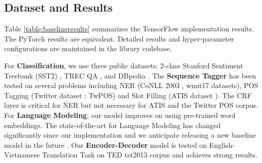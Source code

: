 \documentclass[11pt,a4paper]{article}
\begin{document}
\subsection{Dataset and Results}

Table \ref{table:baselineresults} summarizes the TensorFlow implementation results. The PyTorch results are equivalent. Detailed results and hyper-parameter configurations are maintained in the library codebase. 

For \textbf{Classification}, we use three public datasets: 2-class Stanford Sentiment Treebank (SST2) \cite{Socher2013RecursiveDM}, TREC QA \cite{DBLP:conf/sigir/VoorheesT00}, and DBpedia \cite{Auer:2007:DNW:1785162.1785216}. The \textbf{Sequence Tagger} has been tested on several problems including NER (CoNLL 2003 \cite{DBLP:conf/conll/SangM03:03}, wnut17 \cite{DBLP:conf/aclnut/DerczynskiNEL17:17} datasets), POS Tagging (Twitter dataset \cite{DBLP:conf/acl/GimpelSODMEHYFS11:11}: TwPOS) and Slot Filling (ATIS dataset \cite{ATIS:94}). The CRF layer is critical for NER but not necessary for ATIS and the Twitter POS corpus. For \textbf{Language Modeling}, our model improves on  using pre-trained word embeddings. The state-of-the-art for Language Modeling has changed significantly since our implementation and we anticipate releasing a new baseline model in the future \cite{Yang2017BreakingTS:17}. Our \textbf{Encoder-Decoder} model is tested on English-Vietnamese Translation Task on TED tst2013 corpus \cite{cettolo2015iwslt:15}  and achieves strong results.
\end{document}

